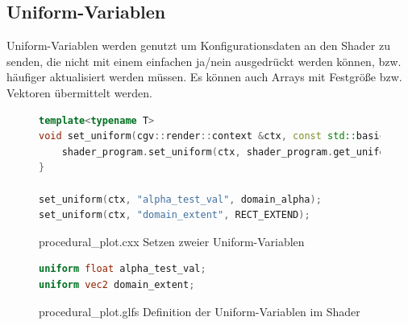 \subsection{Uniform-Variablen}
Uniform-Variablen werden genutzt um Konfigurationsdaten an den Shader zu senden, die nicht mit einem einfachen ja/nein ausgedrückt werden können, bzw. häufiger aktualisiert werden müssen.
Es können auch Arrays mit Festgröße bzw. Vektoren übermittelt werden.
\begin{figure}[ht]
	\begin{lstlisting}[language=C++]
template<typename T>
void set_uniform(cgv::render::context &ctx, const std::basic_string<char> &name, const T &value) {
    shader_program.set_uniform(ctx, shader_program.get_uniform_location(ctx, name), value);
}

set_uniform(ctx, "alpha_test_val", domain_alpha);
set_uniform(ctx, "domain_extent", RECT_EXTEND);
	\end{lstlisting}
	\caption{procedural\_plot.cxx Setzen zweier Uniform-Variablen}
	\label{fig:code_uv1}
\end{figure}
\begin{figure}[ht]
	\begin{lstlisting}[language=GLSL]
uniform float alpha_test_val;
uniform vec2 domain_extent;
	\end{lstlisting}
	\caption{procedural\_plot.glfs Definition der Uniform-Variablen im Shader}
	\label{fig:code_uv2}
\end{figure}
\FloatBarrier

